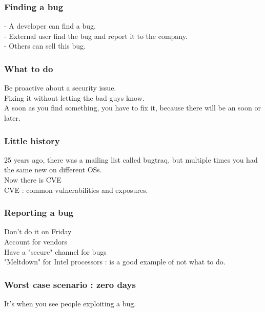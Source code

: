 \documentclass[a4paper,11pt]{article}
\begin{document}
\subsubsection{Finding a bug}

- A developer can find a bug.\\
- External user find the bug and report it to the company.\\
- Others can sell this bug.\\


\subsubsection{What to do}

Be proactive about a security issue.\\
Fixing it without letting the bad guys know.\\

A soon as you find something, you have to fix it, because there will be an soon or later.\\


\subsubsection{Little history}

25 years ago, there was a mailing list called bugtraq, but multiple times you had the same new on different OSs.\\
Now there is CVE\\
CVE : common vulnerabilities and exposures.\\

\subsubsection{ Reporting a bug}
Don't do it on Friday\\
Account for vendors\\
Have a "secure" channel for bugs\\


"Meltdown" for Intel processors : is a good example of not what to do.\\


\subsubsection{Worst case scenario : zero days}
It's when you see people exploiting a bug.
\end{document}
